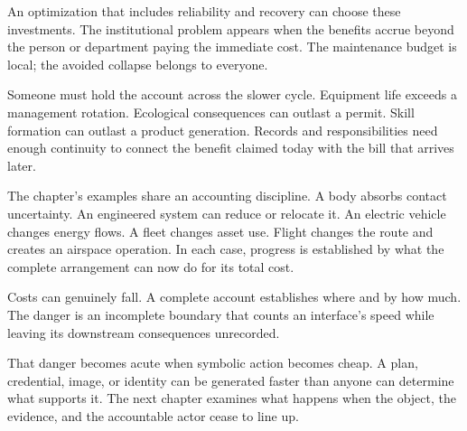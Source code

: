 An optimization that includes reliability and recovery can choose these investments. The institutional problem appears when the benefits accrue beyond the person or department paying the immediate cost. The maintenance budget is local; the avoided collapse belongs to everyone.

Someone must hold the account across the slower cycle. Equipment life exceeds a management rotation. Ecological consequences can outlast a permit. Skill formation can outlast a product generation. Records and responsibilities need enough continuity to connect the benefit claimed today with the bill that arrives later.

The chapter's examples share an accounting discipline. A body absorbs contact uncertainty. An engineered system can reduce or relocate it. An electric vehicle changes energy flows. A fleet changes asset use. Flight changes the route and creates an airspace operation. In each case, progress is established by what the complete arrangement can now do for its total cost.

Costs can genuinely fall. A complete account establishes where and by how much. The danger is an incomplete boundary that counts an interface's speed while leaving its downstream consequences unrecorded.

That danger becomes acute when symbolic action becomes cheap. A plan, credential, image, or identity can be generated faster than anyone can determine what supports it. The next chapter examines what happens when the object, the evidence, and the accountable actor cease to line up.
